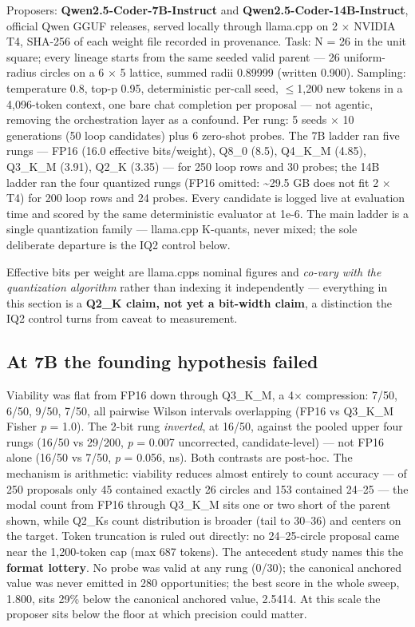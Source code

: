 Proposers: \textbf{Qwen2.5-Coder-7B-Instruct} and \textbf{Qwen2.5-Coder-14B-Instruct}, official Qwen GGUF releases, served locally through llama.cpp on 2 \(\times\) NVIDIA T4, SHA-256 of each weight file recorded in provenance. Task: N = 26 in the unit square; every lineage starts from the same seeded valid parent --- 26 uniform-radius circles on a 6 \(\times\) 5 lattice, summed radii 0.89999 (written 0.900). Sampling: temperature 0.8, top-p 0.95, deterministic per-call seed, \(\leq\)1,200 new tokens in a 4,096-token context, one bare chat completion per proposal --- not agentic, removing the orchestration layer as a confound. Per rung: 5 seeds \(\times\) 10 generations (50 loop candidates) plus 6 zero-shot probes. The 7B ladder ran five rungs --- FP16 (16.0 effective bits/weight), Q8\_0 (8.5), Q4\_K\_M (4.85), Q3\_K\_M (3.91), Q2\_K (3.35) --- for 250 loop rows and 30 probes; the 14B ladder ran the four quantized rungs (FP16 omitted: \textasciitilde29.5 GB does not fit 2 \(\times\) T4) for 200 loop rows and 24 probes. Every candidate is logged live at evaluation time and scored by the same deterministic evaluator at 1e-6. The main ladder is a single quantization family --- llama.cpp K-quants, never mixed; the sole deliberate departure is the IQ2 control below.

Effective bits per weight are llama.cpp\textquotesingle s nominal figures and \emph{co-vary with the quantization algorithm} rather than indexing it independently --- everything in this section is a \textbf{Q2\_K claim, not yet a bit-width claim}, a distinction the IQ2 control turns from caveat to measurement.

\hypertarget{at-7b-the-founding-hypothesis-failed}{%
\subsection{At 7B the founding hypothesis failed}\label{at-7b-the-founding-hypothesis-failed}}

Viability was flat from FP16 down through Q3\_K\_M, a 4\(\times\) compression: 7/50, 6/50, 9/50, 7/50, all pairwise Wilson intervals overlapping (FP16 vs Q3\_K\_M Fisher \emph{p} = 1.0). The 2-bit rung \emph{inverted}, at 16/50, against the pooled upper four rungs (16/50 vs 29/200, \emph{p} = 0.007 uncorrected, candidate-level) --- not FP16 alone (16/50 vs 7/50, \emph{p} = 0.056, ns). Both contrasts are post-hoc. The mechanism is arithmetic: viability reduces almost entirely to count accuracy --- of 250 proposals only 45 contained exactly 26 circles and 153 contained 24--25 --- the modal count from FP16 through Q3\_K\_M sits one or two short of the parent shown, while Q2\_K\textquotesingle s count distribution is broader (tail to 30--36) and centers on the target. Token truncation is ruled out directly: no 24--25-circle proposal came near the 1,200-token cap (max 687 tokens). The antecedent study names this the \textbf{format lottery}. No probe was valid at any rung (0/30); the canonical anchored value was never emitted in 280 opportunities; the best score in the whole sweep, 1.800, sits 29\% below the canonical anchored value, 2.5414. At this scale the proposer sits below the floor at which precision could matter.

